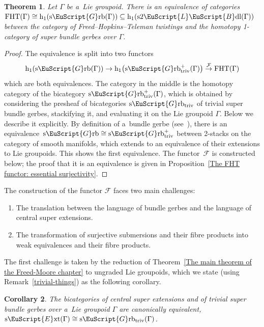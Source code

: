 \documentclass[10pt,a4paper]{amsart}
\numberwithin{equation}{section}
\newtheorem{Theorem}{Theorem}[section]
\newtheorem{Corollary}[Theorem]{Corollary}
\def\mathscr#1{\EuScript{#1}}
\def\hc#1{\mathrm{h}_{#1}}
\def\subset{\subseteq}
\newcommand{\LineBdl}{\mathscr{L}\mathscr{B}\mathrm{dl}}
\newcommand{\stwoLineBdl}{\mathrm{s}2\LineBdl}
\newcommand{\Grb}{\mathscr{G}\mathrm{rb}}
\newcommand{\Grbtriv}{\mathscr{G}\mathrm{rb}_{\mathrm{triv}}}
\newcommand{\sGrb}{\mathrm{s}\Grb}
\newcommand{\sGrbtriv}{\mathrm{s}\Grbtriv}
\def\sExt{\normalfont\text{s}\mathscr{E}\text{xt}}
\begin{document}
\begin{Theorem}
\label{The main theorem of the Freed Hopkins Teleman chapter}
 Let $\Gamma$ be a~Lie groupoid. There is an equivalence of categories
$
\mathrm{FHT}(\Gamma) \cong \hc 1(\sGrb(\Gamma))\subset \hc 1(\stwoLineBdl(\Gamma))
$
between the category of Freed--Hopkins--Teleman twistings and the homotopy 1-category of super bundle gerbes over $\Gamma$.
\end{Theorem}

\begin{proof}
The equivalence is split into two functors
\begin{equation*}
\hc 1(\sGrb(\Gamma)) \to\hc 1\bigl(\sGrbtriv^{+}(\Gamma)\bigr) \stackrel{\mathcal{F}}\to\mathrm{FHT}(\Gamma)
\end{equation*}
which are both equivalences. The category in the middle is the homotopy category of the bicategory $\sGrbtriv^{+}(\Gamma)$, which is obtained by considering the presheaf of bicategories $\sGrbtriv$ of trivial super bundle gerbes, stackifying it, and evaluating it on the Lie groupoid $\Gamma$. Below we describe it explicitly.
By definition of a~bundle gerbe (see~\cite{nikolaus2}), there is an equivalence~${
\sGrb \cong \sGrbtriv^{+}}
$
between 2-stacks on the category of smooth manifolds, which extends to an equivalence of their extensions to Lie groupoids. This shows the first equivalence. The functor~$\mathcal{F}$ is constructed below; the proof that it is an equivalence is given in Proposition~\ref{The FHT functor: essential surjectivity}.
\end{proof}

The construction of the functor $\mathcal{F}$ faces two main challenges:
\begin{enumerate}[(1)]\itemsep=0pt
\item
The translation between the language of bundle gerbes and the language of central super extensions.

\item
The transformation of surjective submersions
and their fibre products into weak equivalences and their fibre products.
\end{enumerate}
The first challenge is taken by the reduction of Theorem~\ref{The main theorem of the Freed-Moore chapter} to ungraded Lie groupoids, which we state (using Remark~\ref{trivial-things}) as the following corollary.

\begin{Corollary}
\label{central-super-extensions-and-line-2-bundles}
The bicategories of
central super extensions and of trivial super bundle gerbes over a~Lie groupoid $\Gamma$ are canonically equivalent,
$
\sExt(\Gamma) \cong \sGrbtriv(\Gamma)$.
\end{Corollary}
\end{document}
